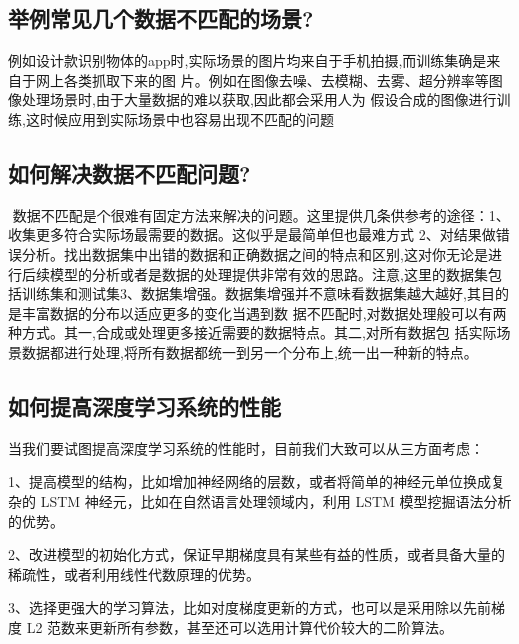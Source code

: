 \subsection{举例常见几个数据不匹配的场景?}\label{ux4e3eux4f8bux5e38ux89c1ux51e0ux4e2aux6570ux636eux4e0dux5339ux914dux7684ux573aux666f}

​
例如设计款识别物体的app时,实际场景的图片均来自于手机拍摄,而训练集确是来自于网上各类抓取下来的图
片。例如在图像去噪、去模糊、去雾、超分辨率等图像处理场景时,由于大量数据的难以获取,因此都会采用人为
假设合成的图像进行训练,这时候应用到实际场景中也容易出现不匹配的问题

\subsection{如何解决数据不匹配问题?}\label{ux5982ux4f55ux89e3ux51b3ux6570ux636eux4e0dux5339ux914dux95eeux9898-1}

​ 数据不匹配是个很难有固定方法来解决的问题。这里提供几条供参考的途径： ​
1、收集更多符合实际场最需要的数据。这似乎是最简单但也最难方式 ​
2、对结果做错误分析。找出数据集中出错的数据和正确数据之间的特点和区别,这对你无论是进行后续模型的分析或者是数据的处理提供非常有效的思路。注意,这里的数据集包括训练集和测试集
​
3、数据集增强。数据集增强并不意味看数据集越大越好,其目的是丰富数据的分布以适应更多的变化当遇到数
据不匹配时,对数据处理般可以有两种方式。其一,合成或处理更多接近需要的数据特点。其二,对所有数据包
括实际场景数据都进行处理,将所有数据都统一到另一个分布上,统一出一种新的特点。

\subsection{如何提高深度学习系统的性能}\label{ux5982ux4f55ux63d0ux9ad8ux6df1ux5ea6ux5b66ux4e60ux7cfbux7edfux7684ux6027ux80fd}

​ 当我们要试图提高深度学习系统的性能时，目前我们大致可以从三方面考虑：

​
1、提高模型的结构，比如增加神经网络的层数，或者将简单的神经元单位换成复杂的
LSTM 神经元，比如在自然语言处理领域内，利用 LSTM
模型挖掘语法分析的优势。

​
2、改进模型的初始化方式，保证早期梯度具有某些有益的性质，或者具备大量的稀疏性，或者利用线性代数原理的优势。

​
3、选择更强大的学习算法，比如对度梯度更新的方式，也可以是采用除以先前梯度
L2 范数来更新所有参数，甚至还可以选用计算代价较大的二阶算法。


